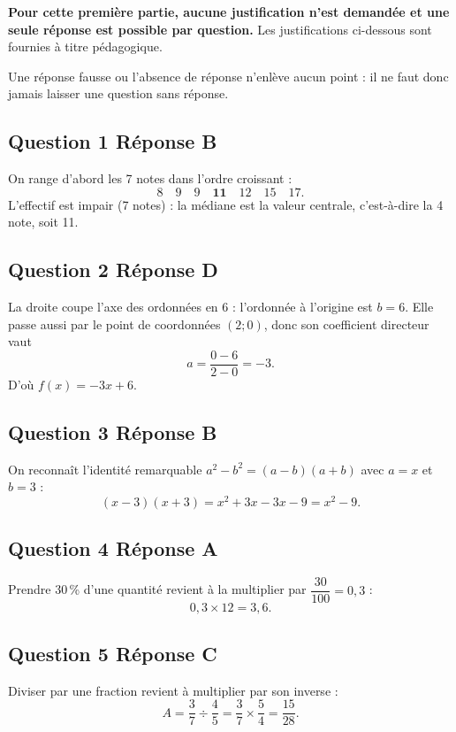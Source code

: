 \textbf{Pour cette première partie, aucune justification n'est demandée et une seule réponse est possible par question.} Les justifications ci-dessous sont fournies à titre pédagogique.

Une réponse fausse ou l'absence de réponse n'enlève aucun point : il ne faut donc jamais laisser une question sans réponse.

\subsection*{Question 1 \quad Réponse B}

On range d'abord les 7 notes dans l'ordre croissant :
\[8 \quad 9 \quad 9 \quad \mathbf{11} \quad 12 \quad 15 \quad 17.\]
L'effectif est impair (7 notes) : la médiane est la valeur centrale, c'est-à-dire la
4 note, soit 11.

\subsection*{Question 2 \quad Réponse D}

La droite coupe l'axe des ordonnées en 6 : l'ordonnée à l'origine est $b = 6$. Elle passe
aussi par le point de coordonnées $(2 ; 0)$, donc son coefficient directeur vaut
\[a = \dfrac{0 - 6}{2 - 0} = -3.\]
D'où $f(x) = -3x + 6$.

\subsection*{Question 3 \quad Réponse B}

On reconnaît l'identité remarquable $a^2 - b^2 = (a-b)(a+b)$ avec $a = x$ et $b = 3$ :
\[(x-3)(x+3) = x^2 + 3x - 3x - 9 = x^2 - 9.\]

\subsection*{Question 4 \quad Réponse A}

Prendre 30\,\% d'une quantité revient à la multiplier par $\dfrac{30}{100} = 0,3$ :
\[0,3 \times 12 = 3,6.\]

\subsection*{Question 5 \quad Réponse C}

Diviser par une fraction revient à multiplier par son inverse :
\[A = \dfrac{3}{7} \div \dfrac{4}{5} = \dfrac{3}{7} \times \dfrac{5}{4} = \dfrac{15}{28}.\]

